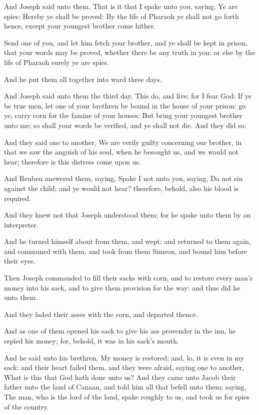 \verse And Joseph said unto them, That is it that I spake unto you, saying, Ye are spies: \verse Hereby ye shall be proved: By the life of Pharaoh ye shall not go forth hence, except your youngest brother come hither.

\verse Send one of you, and let him fetch your brother, and ye shall be kept in prison, that your words may be proved, whether there be any truth in you: or else by the life of Pharaoh surely ye are spies.

\verse And he put them all together into ward three days.

\verse And Joseph said unto them the third day, This do, and live; for I fear God: \verse If ye be true men, let one of your brethren be bound in the house of your prison: go ye, carry corn for the famine of your houses: \verse But bring your youngest brother unto me; so shall your words be verified, and ye shall not die. And they did so.

\verse And they said one to another, We are verily guilty concerning our brother, in that we saw the anguish of his soul, when he besought us, and we would not hear; therefore is this distress come upon us.

\verse And Reuben answered them, saying, Spake I not unto you, saying, Do not sin against the child; and ye would not hear? therefore, behold, also his blood is required.

\verse And they knew not that Joseph understood them; for he spake unto them by an interpreter.

\verse And he turned himself about from them, and wept; and returned to them again, and communed with them, and took from them Simeon, and bound him before their eyes.

\verse Then Joseph commanded to fill their sacks with corn, and to restore every man's money into his sack, and to give them provision for the way: and thus did he unto them.

\verse And they laded their asses with the corn, and departed thence.

\verse And as one of them opened his sack to give his ass provender in the inn, he espied his money; for, behold, it was in his sack's mouth.

\verse And he said unto his brethren, My money is restored; and, lo, it is even in my sack: and their heart failed them, and they were afraid, saying one to another, What is this that God hath done unto us?  \verse And they came unto Jacob their father unto the land of Canaan, and told him all that befell unto them; saying, \verse The man, who is the lord of the land, spake roughly to us, and took us for spies of the country.

